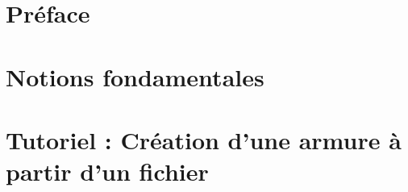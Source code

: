 \documentclass[a4paper]{report}
\begin{document}



\tableofcontents


\chapter*{Préface}



\chapter{Notions fondamentales}



\chapter{Tutoriel : Création d'une armure à partir d'un fichier}

\end{document}
